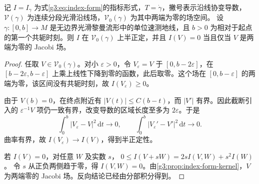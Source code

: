 \begin{proposition}\label{g3:prop:first-conjugate-semidefinite}
	记 \(I=I_\gamma\) 为式\eqref{g3:eq:index-form}的指标形式，\(T=\dot\gamma\)，撇号表示沿线协变导数，\(\mathcal V(\gamma)\) 为连续分段光滑沿线场，\(\mathcal V_0(\gamma)\) 为其中两端为零的场空间。
	设 \(\gamma:[0,b]\to M\) 是无边界光滑黎曼流形中的单位速测地线，且 \(b>0\) 为相对于起点的第一个共轭时刻。则 \(I\) 在 \(\mathcal V_0(\gamma)\) 上半正定，并且 \(I(V)=0\) 当且仅当 \(V\) 是两端为零的 Jacobi 场。
\end{proposition}
\begin{proof}
	任取 \(V\in\mathcal V_0(\gamma)\)。对小 \(\varepsilon>0\)，令 \(V_\varepsilon=V\) 于 \([0,b-2\varepsilon]\)，在 \([b-2\varepsilon,b-\varepsilon]\) 上乘上线性下降到零的函数，此后取零。这个场在 \([0,b-\varepsilon]\) 的两端为零，该区间没有共轭时刻，故 \(I(V_\varepsilon)\ge0\)。

	由于 \(V(b)=0\)，在终点附近有 \(|V(t)|\le C(b-t)\)，而 \(|V'|\) 有界。因此截断引入的 \(\varepsilon^{-1}V\) 项仍一致有界，改变导数的区域长度至多为 \(2\varepsilon\)。于是
	\[
		\int_0^b|V_\varepsilon-V|^2\,\mathrm dt\to0,\qquad
		\int_0^b|V_\varepsilon'-V'|^2\,\mathrm dt\to0.
	\]
	曲率有界，故 \(I(V_\varepsilon)\to I(V)\)，得到半正定性。

	若 \(I(V)=0\)，对任意 \(W\) 及实数 \(s\)，
	\(0\le I(V+sW)=2sI(V,W)+s^2I(W)\)。
	令 \(s\) 从正负两侧趋于零，得 \(I(V,W)=0\)。由\cref{g3:prop:index-form-kernel}，\(V\) 为两端零的 Jacobi 场。反向结论已经由分部积分得到。
\end{proof}


